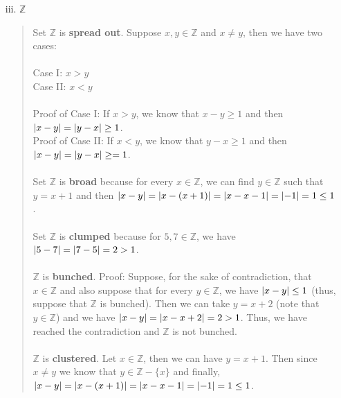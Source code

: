 \documentclass[12pt, a4paper]{article}                      %
\newcommand\und[1]{\underline{\smash{#1}}}
\DeclarePairedDelimiter\abs{\lvert}{\rvert}
\begin{document}
\begin{itemize}
\begin{itemize}
\begin{itemize}
\item[iii.]
$\mathbb{Z}$
\begin{quote}
Set $\mathbb{Z}$ is \textbf{spread out}. Suppose $x, y \in \mathbb{Z}$ and $x \neq y$, then we have two cases:\\\\
Case I: $x > y$\\
Case II: $x < y$\\
\\
Proof of Case I: If $x > y$, we know that $x - y \geq 1$ and then $\abs{x - y} = \abs{y - x} \geq 1$.\\
Proof of Case II: If $x < y$, we know that $y - x \geq 1$ and then $\abs{x - y} = \abs{y - x} \geq = 1$.
\\\\
Set $\mathbb{Z}$ is \textbf{broad} because for every $x \in \mathbb{Z}$, we can find $y \in \mathbb{Z}$ such that $y = x + 1$ and then $\abs{x - y} = \abs{x - (x + 1)} = \abs{x - x - 1} = \abs{-1} = 1 \leq 1$.
\\\\
Set $\mathbb{Z}$ is \und{NOT} \textbf{clumped} because for $5, 7 \in \mathbb{Z}$, we have $\abs{5 - 7} = \abs{7 - 5} = 2 > 1$.
\\\\
$\mathbb{Z}$ is \und{NOT} \textbf{bunched}. Proof: Suppose, for the sake of contradiction, that $x \in \mathbb{Z}$ and also suppose that for every $y \in \mathbb{Z}$, we have $\abs{x - y} \leq 1$ (thus, suppose that $\mathbb{Z}$ is bunched).
Then we can take $y = x + 2$ (note that $y \in \mathbb{Z}$) and we have $\abs{x - y} = \abs{x - x + 2} = 2 > 1$. Thus, we have reached the contradiction and $\mathbb{Z}$ is not bunched.
\\\\
$\mathbb{Z}$ is \textbf{clustered}. Let $x \in \mathbb{Z}$, then we can have $y = x + 1$. Then since $x \neq y$ we know that $y \in \mathbb{Z} - \{x\}$
and finally, $\abs{x - y} = \abs{x - (x + 1)} = \abs{x - x - 1} = \abs{-1} = 1 \leq 1$.
\end{quote}

\item[]


\end{itemize}
\end{itemize}
\end{itemize}
\end{document}

